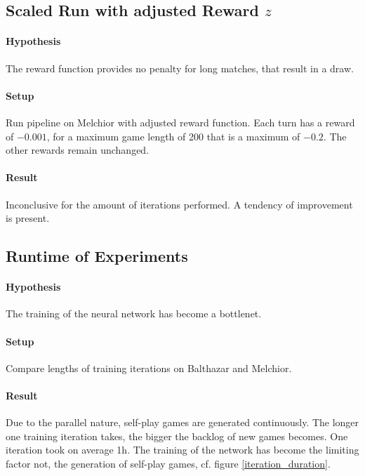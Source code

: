 \subsection{Scaled Run with adjusted Reward $z$}
\paragraph{Hypothesis} The reward function provides no penalty for long matches, that result in a draw.
\paragraph{Setup} Run pipeline on Melchior with adjusted reward function. Each turn has a reward of $-0.001$, for a maximum game length of 200 that is a maximum of $-0.2$. The other rewards remain unchanged.

\paragraph{Result} Inconclusive for the amount of iterations performed. A tendency of improvement is present.
\begin{figure}[!h]
    \centering
    \hfill
    \caption{}
    \label{performance_remote_diff_z}
\end{figure}

\subsection{Runtime of Experiments}
\paragraph{Hypothesis} The training of the neural network has become a bottlenet.
\paragraph{Setup} Compare lengths of training iterations on Balthazar and Melchior.

\paragraph{Result} Due to the parallel nature, self-play games are generated continuously. The longer one training iteration takes, the bigger the backlog of new games becomes. One iteration took on average 1h. The training of the network has become the limiting factor not, the generation of self-play games, cf. figure \ref{iteration_duration}.

